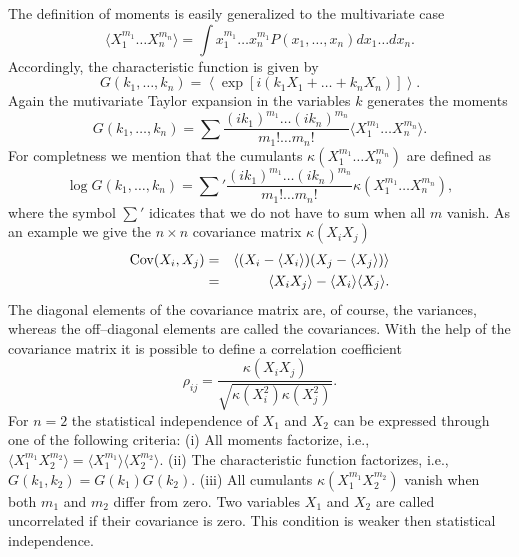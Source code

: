 The definition of moments is easily generalized to the  
multivariate case
\begin{equation}
\langle X_1^{m_1} \ldots X_n^{m_n} \rangle =
\int x_1^{m_1} \ldots x_n^{m_1} P(x_1, \ldots, x_n) dx_1 \ldots 
dx_n.
\end{equation}
Accordingly, the characteristic function is given by
\begin{equation}
G(k_1, \dots, k_n) = \left\langle 
\exp[i(k_1X_1 + \ldots +k_n X_n)]\right\rangle.
\end{equation}
Again the mutivariate Taylor expansion in the variables $k$ 
generates the moments
\begin{equation}
G(k_1, \dots, k_n) = \sum \frac{(ik_1)^{m_1} \ldots (ik_n)^{m_n}}
                  {m_1! \ldots m_n!} 
       \langle X_1^{m_1} \ldots X_n^{m_n} \rangle.
\end{equation}
For completness we mention that the cumulants 
$\kappa(X_1^{m_1} \ldots X_n^{m_n})$ are defined as
\begin{equation}
\log G(k_1, \dots, k_n) = {\sum}' \frac{(ik_1)^{m_1} \ldots (ik_n)^{m_n}}
                  {m_1! \ldots m_n!} 
       \kappa(X_1^{m_1} \ldots X_n^{m_n}),
\end{equation}
where the symbol $\sum'$ idicates that we do not have to sum when 
all $m$ vanish. As an example we give the $n \times n$ covariance
matrix $\kappa(X_i X_j)$
\begin{eqnarray}
{\rm Cov}(X_i, X_j) &=& 
 \langle (X_i-\langle X_i \rangle)(X_j-\langle X_j \rangle)\rangle 
 \\
 & = & \langle X_i X_j \rangle - \langle X_i \rangle \langle X_j 
           \rangle.
 \end{eqnarray}
The diagonal elements of the covariance matrix are, of course, the 
variances, whereas the off--diagonal elements are called the 
covariances.
With the help of the covariance matrix it is possible to define a 
correlation coefficient
\begin{equation}
\rho_{ij} = \frac{\kappa(X_i X_j)}{\sqrt{\kappa(X_i^2) 
\kappa(X_j^2)}}.
\end{equation}
For $n=2$ the statistical independence of $X_1$ and $X_2$ can be 
expressed through one of the following criteria: (i) All moments 
factorize, i.e., $\langle X_1^{m_1} X_2^{m_2}\rangle= 
\langle X_1^{m_1}\rangle \langle X_2^{m_2}\rangle$. (ii) The 
characteristic function factorizes, i.e., $G(k_1,k_2) = 
G(k_1)G(k_2)$. (iii) All cumulants $\kappa(X_1^{m_1}X_2^{m_2})$ 
vanish when both $m_1$ and $m_2$ differ from zero. Two variables $X_1$
and $X_2$ are called uncorrelated if their covariance is zero. 
This condition is weaker then statistical independence.

